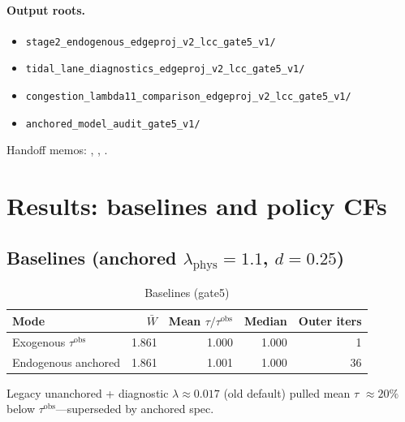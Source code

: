 \documentclass[12pt]{article}
\newcommand{\Wbar}{\bar W}
\newcommand{\obs}{\mathrm{obs}}
\begin{document}
\paragraph{Output roots.}
\begin{itemize}[leftmargin=2em]
  \item \texttt{stage2\_endogenous\_edgeproj\_v2\_lcc\_gate5\_v1/}
  \item \texttt{tidal\_lane\_diagnostics\_edgeproj\_v2\_lcc\_gate5\_v1/}
  \item \texttt{congestion\_lambda11\_comparison\_edgeproj\_v2\_lcc\_gate5\_v1/}
  \item \texttt{anchored\_model\_audit\_gate5\_v1/}
\end{itemize}

Handoff memos:
,
,
.

\section{Results: baselines and policy CFs}\label{sec:results}

\subsection{Baselines (anchored $\lambda_{\mathrm{phys}}=1.1$, $d=0.25$)}

\begin{table}[htbp]
  \centering
  \caption{Baselines (gate5)}
  \begin{tabular}{lrrrr}
  \toprule
  Mode & $\Wbar$ & Mean $\tau/\tau^{\obs}$ & Median & Outer iters \\
  \midrule
  Exogenous $\tau^{\obs}$ & 1.861 & 1.000 & 1.000 & 1 \\
  Endogenous anchored     & 1.861 & 1.001 & 1.000 & 36 \\
  \bottomrule
  \end{tabular}
\end{table}

Legacy unanchored + diagnostic $\lambda\approx 0.017$ (old default) pulled mean
$\tau$ $\approx 20\%$ below $\tau^{\obs}$---superseded by anchored spec.
\end{document}
